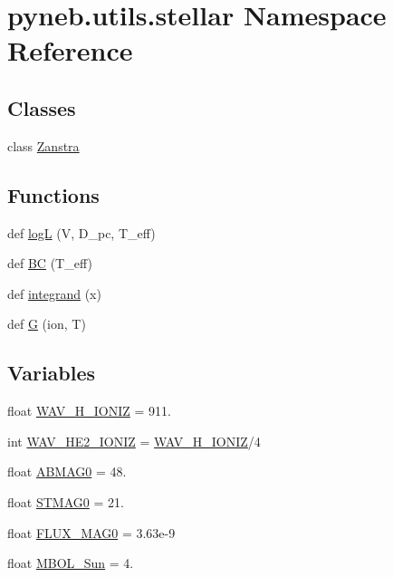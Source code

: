 \hypertarget{namespacepyneb_1_1utils_1_1stellar}{}\section{pyneb.\+utils.\+stellar Namespace Reference}
\label{namespacepyneb_1_1utils_1_1stellar}
\subsection*{Classes}
\begin{DoxyCompactItemize}
\item 
class \hyperlink{classpyneb_1_1utils_1_1stellar_1_1_zanstra}{Zanstra}
\end{DoxyCompactItemize}
\subsection*{Functions}
\begin{DoxyCompactItemize}
\item 
def \hyperlink{namespacepyneb_1_1utils_1_1stellar_ac8707dcb0395c96cc4053e1f46f2c02f}{log\+L} (V, D\+\_\+pc, T\+\_\+eff)
\item 
def \hyperlink{namespacepyneb_1_1utils_1_1stellar_a6a17bb8af2c6325b342af54c660d9aab}{B\+C} (T\+\_\+eff)
\item 
def \hyperlink{namespacepyneb_1_1utils_1_1stellar_a46d2fd9e00f4e0605c2e8c72b904d532}{integrand} (x)
\item 
def \hyperlink{namespacepyneb_1_1utils_1_1stellar_a8a89c2764d0517d414e8da6c2031d601}{G} (ion, T)
\end{DoxyCompactItemize}
\subsection*{Variables}
\begin{DoxyCompactItemize}
\item 
float \hyperlink{namespacepyneb_1_1utils_1_1stellar_afb8d2a4b14477b7097da285535eafc12}{W\+A\+V\+\_\+\+H\+\_\+\+I\+O\+N\+I\+Z} = 911.
\item 
int \hyperlink{namespacepyneb_1_1utils_1_1stellar_a1b0844f39c08a2b7289ad093042cf55e}{W\+A\+V\+\_\+\+H\+E2\+\_\+\+I\+O\+N\+I\+Z} = \hyperlink{namespacepyneb_1_1utils_1_1stellar_afb8d2a4b14477b7097da285535eafc12}{W\+A\+V\+\_\+\+H\+\_\+\+I\+O\+N\+I\+Z}/4
\item 
float \hyperlink{namespacepyneb_1_1utils_1_1stellar_a54ebf26e2af1a957afac5ce6db64de30}{A\+B\+M\+A\+G0} = 48.
\item 
float \hyperlink{namespacepyneb_1_1utils_1_1stellar_a53dc996c80c0bc5ee416b1fcbb8a6afc}{S\+T\+M\+A\+G0} = 21.
\item 
float \hyperlink{namespacepyneb_1_1utils_1_1stellar_ab52d6f24f3c66cb2d6ad7e52bd4b4cd6}{F\+L\+U\+X\+\_\+\+M\+A\+G0} = 3.\+63e-\/9
\item 
float \hyperlink{namespacepyneb_1_1utils_1_1stellar_ab677115958b6555a42963ed87adc1afc}{M\+B\+O\+L\+\_\+\+Sun} = 4.
\end{DoxyCompactItemize}


